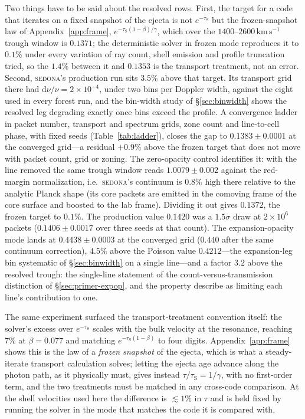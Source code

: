 \documentclass[fleqn,usenatbib]{mnras}
\newcommand{\taus}{\tau_{\mathrm{S}}}
\newcommand{\kms}{\,\mathrm{km\,s^{-1}}}
\begin{document}
Two things have to be said about the resolved rows. First, the target for a
code that iterates on a fixed snapshot of the ejecta is not $e^{-\taus}$ but
the frozen-snapshot law of Appendix~\ref{app:frame},
$e^{-\taus(1-\beta)/\gamma}$, which over the $1400$--$2600\kms$ trough window
is $0.1371$; the deterministic solver in frozen mode reproduces it to
$0.1\%$ under every variation of ray count, shell emission and profile
truncation tried, so the $1.4\%$ between it and $0.1353$ is the transport
treatment, not an error. Second, \textsc{sedona}'s production run sits
$3.5\%$ above that target. Its transport grid there had $\mathrm{d}\nu/\nu =
2\times10^{-4}$, under two bins per Doppler width, against the eight used in
every forest run, and the bin-width study of \S\ref{sec:binwidth} shows the
resolved leg degrading exactly once bins exceed the profile. A convergence
ladder in packet number, transport and spectrum grids, zone count and
line-to-cell phase, with fixed seeds (Table~\ref{tab:ladder}), closes the
gap to $0.1383\pm0.0001$ at the converged grid---a residual $+0.9\%$ above
the frozen target that does not move with packet count, grid or zoning. The
zero-opacity control identifies it: with the line removed the same trough
window reads $1.0079\pm0.002$ against the red-margin normalization, i.e.\
\textsc{sedona}'s continuum is $0.8\%$ high there relative to the analytic
Planck shape (its core packets are emitted in the comoving frame of the core
surface and boosted to the lab frame). Dividing it out gives $0.1372$, the
frozen target to $0.1\%$. The production value $0.1420$ was a $1.5\sigma$
draw at $2\times10^6$ packets ($0.1406\pm0.0017$ over three seeds at that
count). The expansion-opacity mode lands at $0.4438\pm0.0003$ at the converged grid
($0.440$ after the same continuum correction), $4.5\%$ above the Poisson
value $0.4212$---the expansion-leg bin systematic of \S\ref{sec:binwidth} on
a single line---and a factor $3.2$ above the resolved trough: the single-line
statement of the count-versus-transmission distinction of
\S\ref{sec:primer-expop}, and the property \citet{fontes2020} describe as
limiting each line's contribution to one.

The same experiment surfaced the transport-treatment convention itself: the
solver's excess over $e^{-\taus}$ scales with the bulk velocity at the
resonance, reaching $7\%$ at $\beta=0.077$ and matching
$e^{-\taus(1-\beta)}$ to four digits. Appendix~\ref{app:frame} shows this is
the law of a \emph{frozen snapshot} of the ejecta, which is what a
steady-iterate transport calculation solves; letting the ejecta age advance
along the photon path, as it physically must, gives instead
$\tau/\taus = 1/\gamma$, with no first-order term, and the two treatments
must be matched in any cross-code comparison. At the shell velocities used
here the difference is $\lesssim1\%$ in $\tau$ and is held fixed by running
the solver in the mode that matches the code it is compared with.
\end{document}
